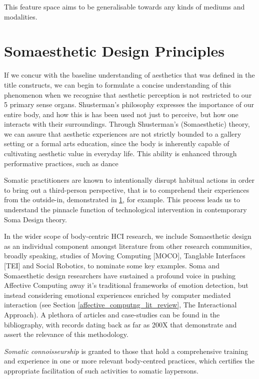 This feature space aims to be generalisable towards any kinds of mediums and modalities.

\section{Somaesthetic Design Principles}

If we concur with the baseline understanding of aesthetics that was defined in the title constructs, we can begin to formulate a concise understanding of this phenomenon when we recognise that aesthetic perception is not restricted to our 5 primary sense organs. Shusterman's philosophy expresses the importance of our entire body, and how this is has been used not just to perceive, but how one interacts with their surroundings. Through Shusterman’s (Somaesthetic) theory, we can assure that aesthetic experiences are not strictly bounded to a gallery setting or a formal arts education, since the body is inherently capable of cultivating aesthetic value in everyday life. This ability is enhanced through performative practices, such as dance \cite{eric_c_mullis_performative_2006}

Somatic practitioners are known to intentionally disrupt habitual actions in order to bring out a third-person perspective, that is to comprehend their experiences from the outside-in, demonstrated in \ref{}, for example. This process leads us to understand the pinnacle function of technological intervention in contemporary Soma Design theory.

In the wider scope of body-centric HCI research, we include Somaesthetic design as an individual component amongst literature from other research communities, broadly speaking, studies of Moving Computing [MOCO], Tanglable Interfaces [TEI] and Social Robotics, to nominate some key examples. Soma and Somaesthetic design researchers have sustained a profound voice in pushing Affective Computing away it's traditional frameworks of emotion detection, but instead considering emotional experiences enriched by computer mediated interaction (see Section \ref{affective_computng_lit_review}, The Interactional Approach). A plethora of articles and case-studies can be found in the bibliography, with records dating back as far as 200X that demonstrate and assert the relevance of this methodology.

\textit{Somatic connoisseurship} is granted to those that hold a comprehensive training and experience in one or more relevant body-centred practices, which certifies the appropriate facilitation of such activities to somatic laypersons.

